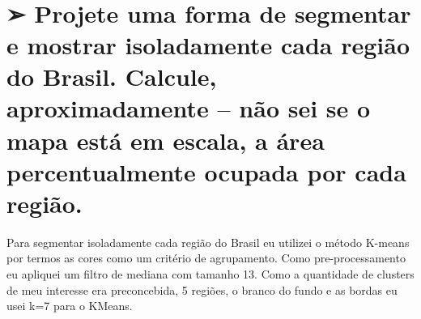 \documentclass[11pt]{article}
\begin{document}
    \begin{center}
    \end{center}
    { \hspace*{\fill} \\}
    
    \hypertarget{projete-uma-forma-de-segmentar-e-mostrar-isoladamente-cada-regiuxe3o-do-brasil.-calcule-aproximadamente-nuxe3o-sei-se-o-mapa-estuxe1-em-escala-a-uxe1rea-percentualmente-ocupada-por-cada-regiuxe3o.}{%
\section{➢ Projete uma forma de segmentar e mostrar isoladamente cada
região do Brasil. Calcule, aproximadamente -- não sei se o mapa está em
escala, a área percentualmente ocupada por cada
região.}\label{projete-uma-forma-de-segmentar-e-mostrar-isoladamente-cada-regiuxe3o-do-brasil.-calcule-aproximadamente-nuxe3o-sei-se-o-mapa-estuxe1-em-escala-a-uxe1rea-percentualmente-ocupada-por-cada-regiuxe3o.}}

Para segmentar isoladamente cada região do Brasil eu utilizei o método
K-means por termos as cores como um critério de agrupamento. Como
pre-processamento eu apliquei um filtro de mediana com tamanho 13. Como
a quantidade de clusters de meu interesse era preconcebida, 5 regiões, o
branco do fundo e as bordas eu usei k=7 para o KMeans.
\end{document}
